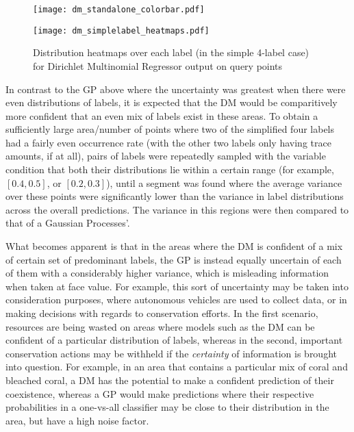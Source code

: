 \begin{figure}[H]
    \begin{minipage}{\linewidth}
        \centerline{\texttt{[image: dm\_standalone\_colorbar.pdf]}}
        \centerline{\texttt{[image: dm\_simplelabel\_heatmaps.pdf]}}
        \caption{Distribution heatmaps over each label (in the simple 4-label case) for Dirichlet Multinomial Regressor output on query points}
        \label{fig:dm_4label_heatmap}
    \end{minipage}
    \hfill
\end{figure}

In contrast to the GP above where the uncertainty was greatest when there were even distributions of labels, it is expected that the DM would be comparitively more confident that an even mix of labels exist in these areas. To obtain a sufficiently large area/number of points where two of the simplified four labels had a fairly even occurrence rate (with the other two labels only having trace amounts, if at all), pairs of labels were repeatedly sampled with the variable condition that both their distributions lie within a certain range (for example, $[0.4, 0.5]$, or $[0.2, 0.3]$), until a segment was found where the average variance over these points were significantly lower than the variance in label distributions across the overall predictions. The variance in this regions were then compared to that of a Gaussian Processes'.


What becomes apparent is that in the areas where the DM is confident of a mix of certain set of predominant labels, the GP is instead equally uncertain of each of them with a considerably higher variance, which is misleading information when taken at face value. For example, this sort of uncertainty may be taken into consideration purposes, where autonomous vehicles are used to collect data, or in making decisions with regards to conservation efforts. In the first scenario, resources are being wasted on areas where models such as the DM can be confident of a particular distribution of labels, whereas in the second, important conservation actions may be withheld if the \textit{certainty} of information is brought into question. For example, in an area that contains a particular mix of coral and bleached coral, a DM has the potential to make a confident prediction of their coexistence, whereas a GP would make predictions where their respective probabilities in a one-vs-all classifier may be close to their distribution in the area, but have a high noise factor.

